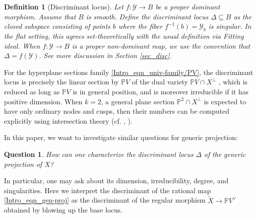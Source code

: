 \documentclass[12pt]{amsart}
\newtheorem{definition}[theorem]{Definition}
\newtheorem{question}[theorem]{Question}
\begin{document}
\begin{definition}[Discriminant locus]\normalfont\label{Intro_def_disc}
    Let $f:\mathcal{Y}\to B$ be a proper dominant morphism. Assume that $B$ is smooth. Define the \textit{discriminant locus} $\Delta\subseteq B$ as the closed subspace consisting of points $b$ where the fiber $f^{-1}(b)=\mathcal{Y}_b$ is singular. In the flat setting, this agrees set-theoretically with the usual definition via Fitting ideal. When $f: \mathcal Y\to B$ is a proper non-dominant map, we use the convention that $\Delta=f(\mathcal Y)$. See more discussion in Section \ref{sec_disc}. %
\end{definition}



For the hyperplane sections family \eqref{Intro_eqn_univ-family/PV}, the discriminant locus is precisely the linear section by $\mathbb PV$ of the dual variety $\mathbb PV\cap X^{\perp}$ \cite{GKZ08}, which is reduced as long as $\mathbb PV$ is in general position, and is moreover irreducible if it has positive dimension. When $k=2$, a general plane section $\mathbb P^2\cap X^{\perp}$ is expected to have only ordinary nodes and cusps, then their numbers can be computed explicitly using intersection theory (cf. \cite[(2.2), (2.3)]{DolLib81}, \cite{Roberts}).

In this paper, we want to investigate similar questions for generic projection:








\begin{question}
    How can one characterize the discriminant locus $\Delta$ of the generic projection of $X$? %
\end{question}
In particular, one may ask about its dimension, irreducibility, degree, and singularities. Here we interpret the discriminant of the rational map \eqref{Intro_eqn_gen-proj} as the discriminant of the regular morphism $\tilde{X}\to \mathbb PV^{\vee}$ obtained by blowing up the base locus.
\end{document}
